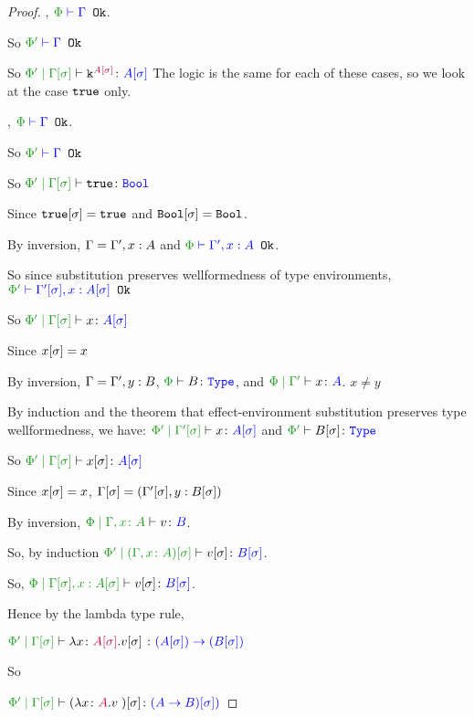 \documentclass{report}
\begin{document}
\begin{framed}
    \begin{proof}
        
    \case{\vconst}
    \bi, $\wellformedok{\P}{\G}$.
    
    So $\wellformedok{\P'}{\G}$
    
    So $\etyperelation{\P'}{\G\ssi}{\const{A\ssi}}{A\ssi}$
    \case{\vtrue, \vfalse, \vunit}
    The logic is the same for each of these cases, so we look at the case $\texttt{true}$ only.
    
    \bi, $\wellformedok{\P}{\G}$.
    
    So $\wellformedok{\P'}{\G}$
    
    So $\etyperelation{\P'}{\G\ssi}{\t}{\B}$
    
    Since $\texttt{true}[\sigma]=\texttt{true}$ and $\texttt{Bool}[\sigma]=\texttt{Bool}$.
    
    \case{\vvar}
    By inversion,  $\Gamma = \Gamma', x:A$ and $\wellformedok{\P}{\G', x:A}$.
    
    So since substitution preserves wellformedness of type environments, $\wellformedok{\P'}{\G'\ssi, x:A\ssi}$
    
    So $\etyperelation{\P'}{\G\ssi}{x}{A\ssi}$
    
    Since $x[\sigma] = x$
    
    \case{\vweaken}
    By inversion,  $\Gamma = \Gamma', y:B$, $\wellformedt{\P}{B}$, and $\etyperelation{\P}{\G'}{x}{A}$. $x \neq y$
    
    By induction and the theorem that effect-environment substitution preserves type wellformedness, we have: $\etyperelation{\P'}{\G'\ssi}{x}{A\ssi}$ and $\wellformedt{\P'}{B\ssi}$
    
    So $\etyperelation{\P'}{\G\ssi}{x\ssi}{A\ssi}$
    
    Since $x[\sigma] = x$, $\Gamma[\sigma] = (\Gamma'[\sigma], y:B[\sigma])$
    
    
    \case{\vfun}
    By inversion,  $\etyperelation{\P}{\gax}{v}{B}$.
    
    So, by induction $\etyperelation{\P'}{(\gax)\ssi}{v\ssi}{B\ssi}$.
    
    So, $\etyperelation{\P}{\G\ssi, x:A\ssi}{v\ssi}{B\ssi}$.
    
    Hence by the lambda type rule,
    
    $\etyperelation{\P'}{\G\ssi}{\lam{x}{A\ssi}{v\ssi}}{\fntype{(A\ssi)}{(B\ssi)}}$
    
    So
    
    $\etyperelation{\P'}{\G\ssi}{(\lam{x}{A}{v})\ssi}{(\ab)\ssi)}$
    

\end{proof}
\end{framed}
\end{document}
